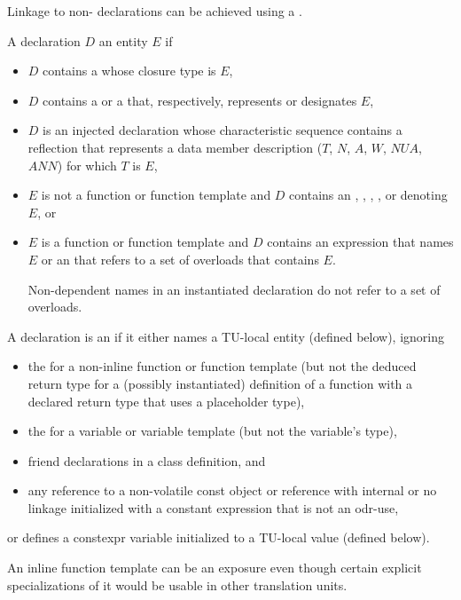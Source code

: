 \pnum
\begin{note}
Linkage to non-\Cpp{} declarations can be achieved using a
.
\end{note}

\pnum
A declaration $D$  an entity $E$ if
\begin{itemize}
\item
$D$ contains a  whose closure type is $E$,
\item
$D$ contains
a  or a 
that, respectively, represents or designates $E$,
\item
$D$ is an injected declaration
whose characteristic sequence contains a reflection
that represents
a data member description ($T$, $N$, $A$, $W$, $\mathit{NUA}$, $\mathit{ANN}$)
for which $T$ is $E$,
\item
$E$ is not a function or function template and $D$ contains an
,
,
,
, or
denoting $E$, or
\item
$E$ is a function or function template and
$D$ contains an expression that names $E$ or
an 
that refers to a set of overloads that contains $E$.
\begin{note}
Non-dependent names in an instantiated declaration
do not refer to a set of overloads.
\end{note}
\end{itemize}

\pnum
A declaration is an 
if it either names a TU-local entity (defined below), ignoring
\begin{itemize}
\item
the 
for a non-inline function or function template
(but not the deduced return type
for a (possibly instantiated) definition of a function
with a declared return type that uses a placeholder type),
\item
the 
for a variable or variable template (but not the variable's type),
\item
friend declarations in a class definition, and
\item
any reference to a non-volatile const object or reference
with internal or no linkage initialized with a constant expression
that is not an odr-use,
\end{itemize}
or defines a constexpr variable initialized to a TU-local value (defined below).
\begin{note}
An inline function template can be an exposure even though
certain explicit specializations of it would be usable in other translation units.
\end{note}

